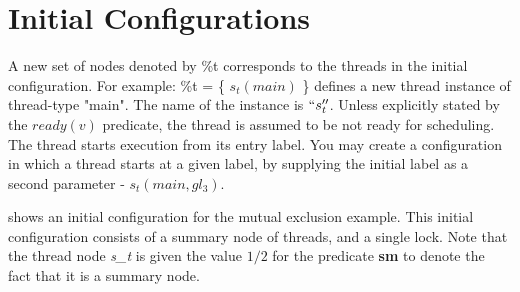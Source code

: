 \section{Initial Configurations}

A new set of nodes denoted by \%t corresponds to the threads in
the initial configuration. For example: \%t = \{ $s_t(main)$ \}
defines a new thread instance of thread-type "main". The name of
the instance is $``s_t''$. Unless explicitly stated by the
$ready(v)$ predicate, the thread is assumed to be not ready for
scheduling. The thread starts execution from its entry label. You
may create a configuration in which a thread starts at a given
label, by supplying the initial label as a second parameter -
$s_t(main,gl_3)$.

 shows an initial configuration for the mutual
exclusion example. This initial configuration consists of a
summary node of threads, and a single lock. Note that the thread
node \emph{s\_t} is given the value $1/2$ for the predicate
\textbf{sm} to denote the fact that it is a summary node.



